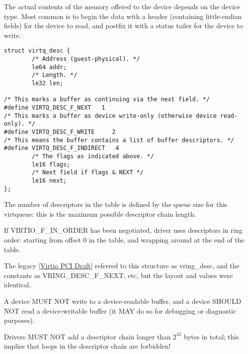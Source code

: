 The actual contents of the memory offered to the device depends on the
device type.  Most common is to begin the data with a header
(containing little-endian fields) for the device to read, and postfix
it with a status tailer for the device to write.

\begin{lstlisting}
struct virtq_desc {
        /* Address (guest-physical). */
        le64 addr;
        /* Length. */
        le32 len;

/* This marks a buffer as continuing via the next field. */
#define VIRTQ_DESC_F_NEXT   1
/* This marks a buffer as device write-only (otherwise device read-only). */
#define VIRTQ_DESC_F_WRITE     2
/* This means the buffer contains a list of buffer descriptors. */
#define VIRTQ_DESC_F_INDIRECT   4
        /* The flags as indicated above. */
        le16 flags;
        /* Next field if flags & NEXT */
        le16 next;
};
\end{lstlisting}

The number of descriptors in the table is defined by the queue size
for this virtqueue: this is the maximum possible descriptor chain length.

If VIRTIO_F_IN_ORDER has been negotiated, driver uses
descriptors in ring order: starting from offset 0 in the table,
and wrapping around at the end of the table.

\begin{note}
The legacy \hyperref[intro:Virtio PCI Draft]{[Virtio PCI Draft]}
referred to this structure as vring_desc, and the constants as
VRING_DESC_F_NEXT, etc, but the layout and values were identical.
\end{note}

A device MUST NOT write to a device-readable buffer, and a device SHOULD NOT
read a device-writable buffer (it MAY do so for debugging or diagnostic
purposes).

Drivers MUST NOT add a descriptor chain longer than $2^{32}$ bytes in total;
this implies that loops in the descriptor chain are forbidden!

